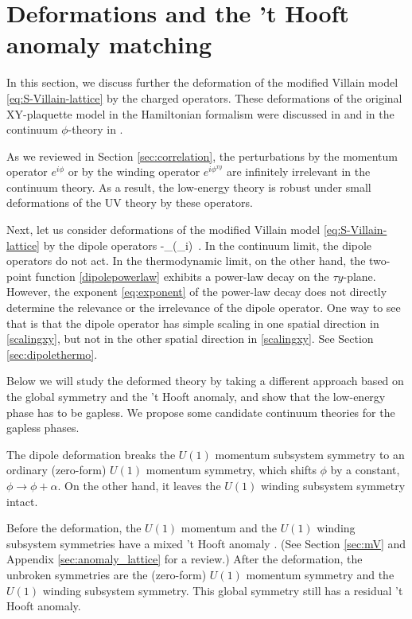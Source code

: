 \documentclass[12pt]{article}
\numberwithin{equation}{section}
\begin{document}
\section{Deformations and the 't Hooft anomaly matching}\label{sec:dipole-deform}



In this section, we discuss further the deformation of the modified Villain model \eqref{eq:S-Villain-lattice} by  the charged operators. These deformations of the original XY-plaquette model in the Hamiltonian formalism were discussed in \cite{PhysRevB.66.054526} and in the continuum $\phi$-theory in \cite{paper1}.

As we reviewed in Section \ref{sec:correlation}, the perturbations by the momentum operator $e^{i\phi}$ or by the winding operator $e^{i\phi^{xy}}$ are infinitely irrelevant in the continuum theory.
As a result, the low-energy theory is robust under small deformations of the UV theory by these operators.

Next, let us consider deformations of the modified Villain model \eqref{eq:S-Villain-lattice} by the dipole operators
\ie\label{dipoledef}
-\varepsilon\sum_\cos(\Delta_i\phi)~.
\fe
 In the continuum limit,  the dipole operators do not act.
 In the thermodynamic limit, on the other hand,
the two-point function \eqref{dipolepowerlaw} exhibits  a power-law decay on the $\tau y$-plane.
However,
the exponent \eqref{eq:exponent} of the power-law decay does not directly determine the relevance or the irrelevance of the dipole operator.  One way to see that is that the dipole operator has simple scaling in one spatial direction in \eqref{scalingxy}, but not in the other spatial direction in \eqref{scalingxy}. See Section \ref{sec:dipolethermo}.

 Below we will study the deformed theory by taking a different approach based on the global symmetry and the 't Hooft anomaly, and show that the low-energy phase has to be gapless. We propose some candidate continuum theories for the gapless phases.



The dipole deformation breaks the $U(1)$ momentum subsystem symmetry to an ordinary (zero-form) $U(1)$ momentum  symmetry, which  shifts $\phi$ by  a constant, $\phi\rightarrow\phi+\alpha$.
On the other hand, it leaves the $U(1)$ winding subsystem symmetry intact.


Before the deformation, the $U(1)$ momentum and the $U(1)$ winding subsystem symmetries have a mixed 't Hooft anomaly \cite{Gorantla:2021svj}. (See Section \ref{sec:mV} and Appendix \ref{sec:anomaly_lattice} for a review.)
After the deformation, the unbroken symmetries are the (zero-form) $U(1)$ momentum symmetry and the $U(1)$ winding subsystem symmetry.  This global symmetry still has a residual 't Hooft anomaly.
\end{document}
